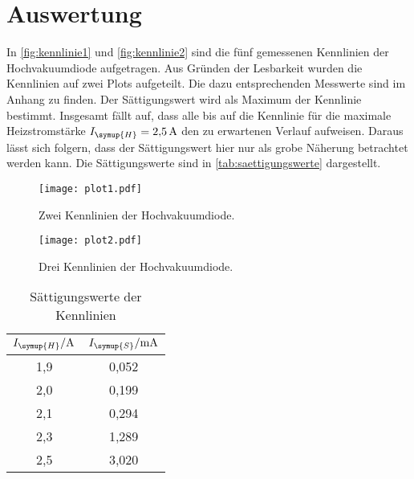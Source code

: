 \section{Auswertung}
\label{sec:Auswertung}
In \autoref{fig:kennlinie1} und \autoref{fig:kennlinie2} sind die fünf gemessenen Kennlinien der Hochvakuumdiode
aufgetragen. Aus Gründen der Lesbarkeit wurden die Kennlinien auf zwei Plots aufgeteilt. Die dazu entsprechenden
Messwerte sind im Anhang zu finden. Der Sättigungswert wird als Maximum der Kennlinie bestimmt. Insgesamt fällt
auf, dass alle bis auf die Kennlinie für die maximale Heizstromstärke $I_{\symup{H}}=\SI{2,5}{\ampere}$ den zu
erwartenen Verlauf aufweisen. Daraus lässt sich folgern, dass der Sättigungswert hier nur als grobe Näherung
betrachtet werden kann. Die Sättigungswerte sind in \autoref{tab:saettigungswerte} dargestellt.
\begin{figure}
  \centering
  \texttt{[image: plot1.pdf]}
  \caption{Zwei Kennlinien der Hochvakuumdiode.}
  \label{fig:kennlinie1}
\end{figure}

\begin{figure}
  \centering
  \texttt{[image: plot2.pdf]}
  \caption{Drei Kennlinien der Hochvakuumdiode.}
  \label{fig:kennlinie2}
\end{figure}
\begin{table}
  \centering
  \caption{Sättigungswerte der Kennlinien}
  \label{tab:saettigungswerte}
  \begin{tabular}{c c}
    \toprule
    $I_{\symup{H}}/\si{\ampere}$ & $I_{\symup{S}}/\si{\milli\ampere}$ \\
    \midrule
    1,9 & 0,052 \\
    2,0 & 0,199 \\
    2,1 & 0,294 \\
    2,3 & 1,289 \\
    2,5 & 3,020 \\
    \bottomrule
  \end{tabular}
\end{table}

